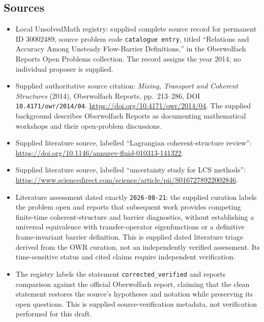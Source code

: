 \documentclass[11pt]{article}
\begin{document}
\subsection{Sources}
\begin{itemize}
\item Local UnsolvedMath registry: supplied complete source record for permanent ID \(30002489\), source problem code \texttt{catalogue entry}, titled ``Relations and Accuracy Among Unsteady Flow-Barrier Definitions,'' in the Oberwolfach Reports Open Problems collection. The record assigns the year 2014; no individual proposer is supplied.
\item Supplied authoritative source citation: \emph{Mixing, Transport and Coherent Structures} (2014), Oberwolfach Reports, pp.~213--286, DOI \texttt{10.4171/owr/2014/04}. \url{https://doi.org/10.4171/owr/2014/04}. The supplied background describes Oberwolfach Reports as documenting mathematical workshops and their open-problem discussions.
\item Supplied literature source, labelled ``Lagrangian coherent-structure review'': \url{https://doi.org/10.1146/annurev-fluid-010313-141322}.
\item Supplied literature source, labelled ``uncertainty study for LCS methods'': \url{https://www.sciencedirect.com/science/article/pii/S0167278922002846}.
\item Literature assessment dated exactly \texttt{2026-08-21}: the supplied curation labels the problem open and reports that subsequent work provides competing finite-time coherent-structure and barrier diagnostics, without establishing a universal equivalence with transfer-operator eigenfunctions or a definitive frame-invariant barrier definition. This is supplied dated literature triage derived from the OWR curation, not an independently verified assessment. Its time-sensitive status and cited claims require independent verification.
\item The registry labels the statement \texttt{corrected\_verified} and reports comparison against the official Oberwolfach report, claiming that the clean statement restores the source's hypotheses and notation while preserving its open questions. This is supplied source-verification metadata, not verification performed for this draft.
\end{itemize}
\end{document}
